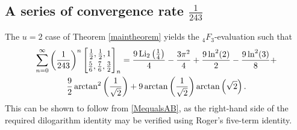 \documentclass[12pt]{article}
\begin{document}
\subsection{A series of convergence rate $\frac{1}{243}$}
 The $u = 
 2$ case of Theorem \ref{maintheorem} yields the ${}_{4}F_{3}$-evaluation such that 
\begin{multline*}
 \sum_{n=0}^{\infty} \left( \frac{1}{243} \right)^{n} 
 \left[ \begin{matrix} \frac{1}{2}, \frac{1}{2}, 1 
 \vspace{1mm} \\ 
 \frac{5}{6}, \frac{7}{6}, \frac{3}{2} \end{matrix} \right]_{n} 
 = \frac{9 \operatorname{Li}_2\left(\frac{1}{4}\right)}{4}-\frac{3 \pi ^2}{4}+\frac{9 \ln^2(2)}{2}-\frac{9 \ln ^2(3)}{8} + \\ 
 \frac{9}{2} \operatorname{arctan}^{2}\left(\frac{1}{\sqrt{2}}\right) + 
 9 \operatorname{arctan}\left(\frac{1}{\sqrt{2}}\right) \operatorname{arctan}\left(\sqrt{2}\right). 
\end{multline*}
 This can be shown to follow from \eqref{MequalsAB}, as the right-hand side of the required dilogarithm identity may be verified 
 using Roger's five-term identity. 
\end{document}
